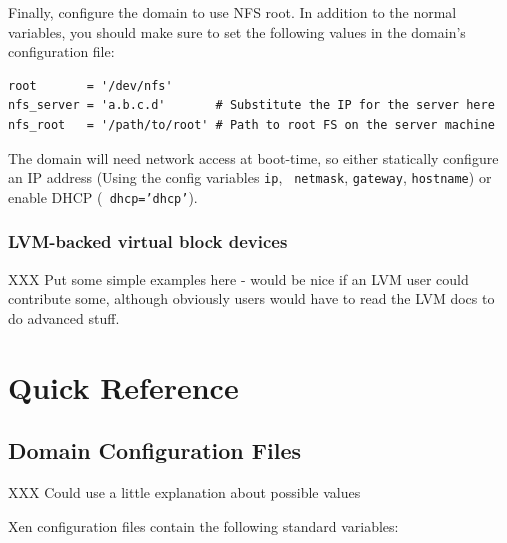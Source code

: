 \documentclass[11pt,twoside,final,openright]{xenstyle}
\begin{document}
Finally, configure the domain to use NFS root.  In addition to the
normal variables, you should make sure to set the following values in
the domain's configuration file:

\begin{verbatim}
root       = '/dev/nfs'
nfs_server = 'a.b.c.d'       # Substitute the IP for the server here
nfs_root   = '/path/to/root' # Path to root FS on the server machine
\end{verbatim}

The domain will need network access at boot-time, so either statically
configure an IP address (Using the config variables {\tt ip}, {\tt
netmask}, {\tt gateway}, {\tt hostname}) or enable DHCP ({\tt
dhcp='dhcp'}).

\section{LVM-backed virtual block devices}

XXX Put some simple examples here - would be nice if an LVM user could
contribute some, although obviously users would have to read the LVM
docs to do advanced stuff.

\part{Quick Reference}

\chapter{Domain Configuration Files}
\label{cha:config}

XXX Could use a little explanation about possible values

Xen configuration files contain the following standard variables:
\end{document}
